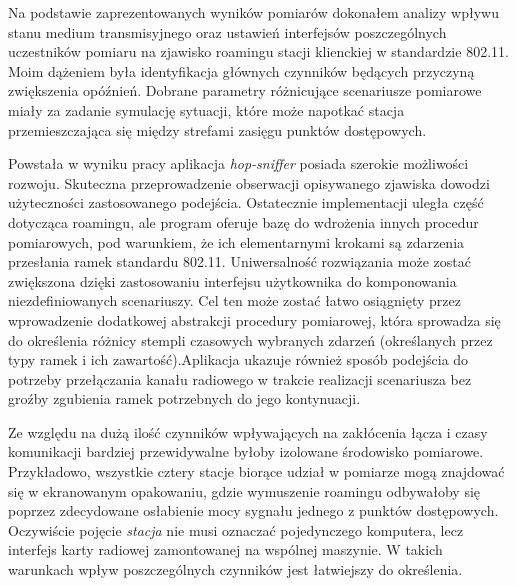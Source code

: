 
Na podstawie zaprezentowanych wyników pomiarów dokonałem analizy wpływu stanu medium transmisyjnego oraz ustawień interfejsów poszczególnych uczestników pomiaru na zjawisko roamingu stacji klienckiej w standardzie 802.11. Moim dążeniem była identyfikacja głównych czynników będących przyczyną zwiększenia opóźnień. Dobrane parametry różnicujące scenariusze pomiarowe miały za zadanie symulację sytuacji, które może napotkać stacja przemieszczająca się między strefami zasięgu punktów dostępowych.

Powstała w wyniku pracy aplikacja \emph{hop-sniffer} posiada szerokie możliwości rozwoju. Skuteczna przeprowadzenie obserwacji opisywanego zjawiska dowodzi użyteczności zastosowanego podejścia. Ostatecznie implementacji uległa część dotycząca roamingu, ale program oferuje bazę do wdrożenia innych procedur pomiarowych, pod warunkiem, że ich elementarnymi krokami są zdarzenia przesłania ramek standardu 802.11. Uniwersalność rozwiązania może zostać zwiększona dzięki zastosowaniu interfejsu użytkownika do komponowania niezdefiniowanych scenariuszy. Cel ten może zostać łatwo osiągnięty przez wprowadzenie dodatkowej abstrakcji procedury pomiarowej, która sprowadza się do określenia różnicy stempli czasowych wybranych zdarzeń (określanych przez typy ramek i ich zawartość).Aplikacja ukazuje również sposób podejścia do potrzeby przełączania kanału radiowego w trakcie realizacji scenariusza bez groźby zgubienia ramek potrzebnych do jego kontynuacji. 

Ze względu na dużą ilość czynników wpływających na zakłócenia łącza i czasy komunikacji bardziej przewidywalne byłoby izolowane środowisko pomiarowe. Przykładowo, wszystkie cztery stacje biorące udział w pomiarze mogą znajdować się w ekranowanym opakowaniu, gdzie wymuszenie roamingu odbywałoby się poprzez zdecydowane osłabienie mocy sygnału jednego z punktów dostępowych. Oczywiście pojęcie \emph{stacja} nie musi oznaczać pojedynczego komputera, lecz interfejs karty radiowej zamontowanej na wspólnej maszynie. W takich warunkach wpływ poszczególnych czynników jest łatwiejszy do określenia. 




